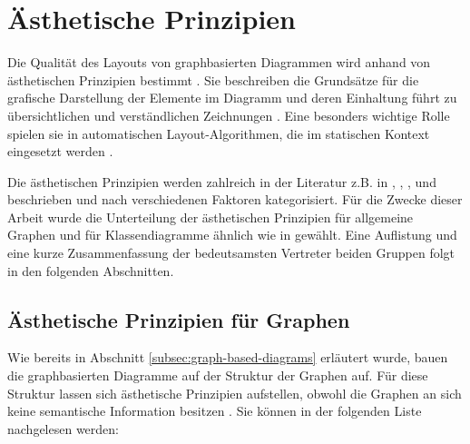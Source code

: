\section{Ästhetische Prinzipien}
\label{sec:aesthetics-criteria}

Die Qualität des Layouts von graphbasierten Diagrammen wird anhand von ästhetischen Prinzipien bestimmt \cite{Maier12A-Pattern-based}. Sie beschreiben die Grundsätze für die grafische Darstellung der Elemente im Diagramm und deren Einhaltung führt zu übersichtlichen und verständlichen Zeichnungen \cite{Siebenhaller03Automatisches}. Eine besonders wichtige Rolle spielen sie in automatischen Layout-Algorithmen, die im statischen Kontext eingesetzt werden \cite{Maier12A-Pattern-based}.

Die ästhetischen Prinzipien werden zahlreich in der Literatur z.B. in \cite{Siebenhaller03Automatisches}, \cite{EichelbergerSchmid09Guidelines}, \cite{Ambler05The-Elements}, \cite{Eichelberger05Aesthetics} und \cite{ShieberKosak93Automating} beschrieben und nach verschiedenen Faktoren kategorisiert. Für die Zwecke dieser Arbeit wurde die Unterteilung der ästhetischen Prinzipien für allgemeine Graphen und für Klassendiagramme ähnlich wie in \cite{Siebenhaller03Automatisches} gewählt. Eine Auflistung und eine kurze Zusammenfassung der bedeutsamsten Vertreter beiden Gruppen folgt in den folgenden Abschnitten.

\subsection{Ästhetische Prinzipien für Graphen}
\label{subsec:aesthetics-criteria-graphs}

Wie bereits in Abschnitt \ref{subsec:graph-based-diagrams} erläutert wurde, bauen die graphbasierten Diagramme auf der Struktur der Graphen auf. Für diese Struktur lassen sich ästhetische Prinzipien aufstellen, obwohl die Graphen an sich keine semantische Information besitzen \cite{Siebenhaller03Automatisches}. Sie können in der folgenden Liste nachgelesen werden:

